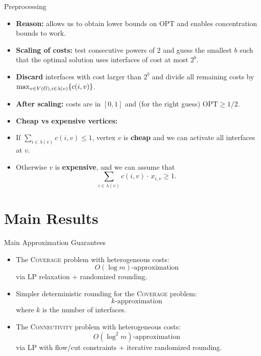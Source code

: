 \documentclass[aspectratio=169]{beamer}
\newcommand{\coverage}{\textsc{Coverage}\xspace}
\newcommand{\connectivity}{\textsc{Connectivity}\xspace}
\newcommand{\OPT}{\mathrm{OPT}}
\begin{document}
\begin{frame}{Preprocessing}
  \begin{itemize}
    \item \textbf{Reason:} allows us to obtain lower bounds on $\OPT$ and enables concentration bounds to work.
    \pause
    \item \textbf{Scaling of costs:} test consecutive powers of $2$ and guess the smallest $b$ such that the optimal solution uses interfaces of cost at most $2^b$.
    \pause
    \item \textbf{Discard} interfaces with cost larger than $2^b$ and divide all remaining costs by $\max_{v\in V\mathopen{}\left( G \right), i\in \lambda\mathopen{}\left( v \right)} \mathopen{}\left\{ c(i,v) \right\}$.
    \pause
    \item \textbf{After scaling:} costs are in $[0,1]$ and (for the right guess) $\OPT \ge 1/2$.
    \pause
    \item \textbf{Cheap vs expensive vertices:}
    \pause
    \item If $\sum_{i\in\lambda(v)} c(i,v) \le 1$, vertex $v$ is \textbf{cheap} and we can activate all interfaces at $v$.
    \pause
    \item Otherwise $v$ is \textbf{expensive}, and we can assume that
    \[
      \sum_{i\in\lambda(v)} c(i,v)\cdot\,x_{i,v} \ge 1.
    \]
  \end{itemize}
\end{frame}

\section{Main Results}
\begin{frame}{Main Approximation Guarantees}
  \begin{itemize}
    \item The \coverage problem with heterogeneous costs:
    \[
      O(\log m)\text{-approximation}
    \]
    via LP relaxation + randomized rounding.

    \pause
    \item Simpler deterministic rounding for the \coverage problem:
    \[
      k\text{-approximation}
    \]
    where $k$ is the number of interfaces.

    \pause
    \item The \connectivity problem with heterogeneous costs:
    \[
      O(\log^2 m)\text{-approximation}
    \]
    via LP with flow/cut constraints + iterative randomized rounding.
  \end{itemize}
\end{frame}
\end{document}
